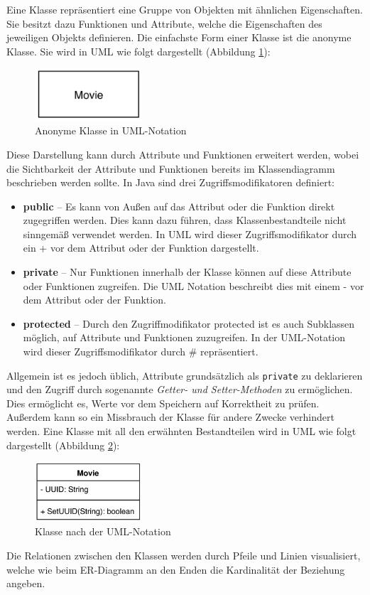 		Eine Klasse repräsentiert eine Gruppe von Objekten mit ähnlichen Eigenschaften. Sie besitzt dazu Funktionen und Attribute, welche die Eigenschaften des jeweiligen Objekts definieren. Die einfachste Form einer Klasse ist die anonyme Klasse. Sie wird in UML wie folgt dargestellt (Abbildung \ref{fig:uml_anonym_class}):
		\begin{figure}[H]
			\centering 
			\includegraphics[width=4cm]{img/uml_anonym_class.JPG}
			\captionsetup{format=hang}
			\caption[Anonyme Klasse in UML-Notation]{\label{fig:uml_anonym_class}Anonyme Klasse in UML-Notation}
		\end{figure}
		Diese Darstellung kann durch Attribute und Funktionen erweitert werden, wobei die Sichtbarkeit der Attribute und Funktionen bereits im Klassendiagramm beschrieben werden sollte. In Java sind drei Zugriffsmodifikatoren definiert:
		\begin{itemize}
			\item\textbf{public} -- Es kann von Außen auf das Attribut oder die Funktion direkt zugegriffen werden. Dies kann dazu führen, dass Klassenbestandteile nicht sinngemäß verwendet werden. In UML wird dieser Zugriffsmodifikator durch ein + vor dem Attribut oder der Funktion dargestellt. 
			\item\textbf{private} -- Nur Funktionen innerhalb der Klasse können auf diese Attribute oder Funktionen zugreifen. Die UML Notation beschreibt dies mit einem - vor dem Attribut oder der Funktion.
			\item\textbf{protected} -- Durch den Zugriffmodifikator protected ist es auch Subklassen möglich, auf Attribute und Funktionen zuzugreifen. In der UML-Notation wird dieser Zugriffsmodifikator durch \# repräsentiert.
		\end{itemize}
		Allgemein ist es jedoch üblich, Attribute grundsätzlich als \texttt{private} zu deklarieren und den Zugriff durch sogenannte \textit{Getter- und Setter-Methoden} zu ermöglichen. Dies ermöglicht es, Werte vor dem Speichern auf Korrektheit zu prüfen. Außerdem kann so ein Missbrauch der Klasse für andere Zwecke verhindert werden. Eine Klasse mit all den erwähnten Bestandteilen wird in UML wie folgt dargestellt (Abbildung \ref{fig:KlasseUML}): 
		\begin{figure}[H]
			\centering 
			\includegraphics[width=4cm]{img/uml_class.JPG}
			\captionsetup{format=hang}
			\caption[Klasse in UML-Notation]{\label{fig:KlasseUML}Klasse nach der UML-Notation}
		\end{figure}
		Die Relationen zwischen den Klassen werden durch Pfeile und Linien visualisiert, welche wie beim ER-Diagramm an den Enden die Kardinalität der Beziehung angeben. 
		
